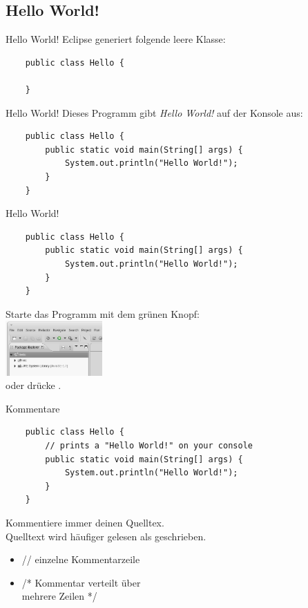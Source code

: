 \subsection{Hello World!}

\begin{frame}[fragile]{Hello World!}
	Eclipse generiert folgende leere Klasse:
	\begin{lstlisting}
	public class Hello {
	
	}
	\end{lstlisting}
\end{frame}

\begin{frame}[fragile]{Hello World!}
	Dieses Programm gibt \emph{Hello World!} auf der Konsole aus:
	\begin{lstlisting}
	public class Hello {
	    public static void main(String[] args) {
	        System.out.println("Hello World!");
	    }
	}
	\end{lstlisting}
\end{frame}

\begin{frame}[fragile]{Hello World!}
	\begin{lstlisting}
	public class Hello {
	    public static void main(String[] args) {
	        System.out.println("Hello World!");
	    }
	}
	\end{lstlisting}
	Starte das Programm mit dem grünen Knopf:\\
	\includegraphics[width=10em]{res/intro_run.png} \\
	oder drücke .
\end{frame}

\begin{frame}[fragile]{Kommentare}
	\begin{lstlisting}
	public class Hello {
	    // prints a "Hello World!" on your console
	    public static void main(String[] args) {
	        System.out.println("Hello World!");
	    }
	}
	\end{lstlisting}
	Kommentiere immer deinen Quelltex. \\
	Quelltext wird häufiger gelesen als geschrieben.
	\begin{itemize}
		\item // einzelne Kommentarzeile
		\item /* Kommentar verteilt über \\
			mehrere Zeilen */
	\end{itemize}
\end{frame}

